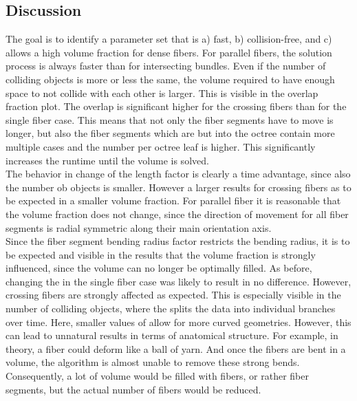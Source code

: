 \subsection{Discussion}
% 
The goal is to identify a parameter set that is a) fast, b) collision-free, and c) allows a high volume fraction for dense fibers.
For parallel fibers, the solution process is always faster than for intersecting bundles.
Even if the number of colliding objects is more or less the same, the volume required to have enough space to not collide with each other is larger.
This is visible in the overlap fraction plot.
The overlap is significant higher for the crossing fibers than for the single fiber case.
This means that not only the fiber segments have to move is longer, but also the fiber segments which are but into the octree contain more multiple cases and the number per octree leaf is higher.
This significantly increases the runtime until the volume is solved.
\\
% 
The behavior in change of the length factor \segLengthFactor{} is clearly a time advantage, since also the number ob objects is smaller.
However a larger \segLengthFactor{} results for crossing fibers as to be expected in a smaller volume fraction.
For parallel fiber it is reasonable that the volume fraction does not change, since the direction of movement for all fiber segments is radial symmetric along their main orientation axis.
\\
% 
Since the fiber segment bending radius factor \segRadiusFactor{} restricts the bending radius, it is to be expected and visible in the results that the volume fraction is strongly influenced, since the volume can no longer be optimally filled.
As before, changing the \segRadiusFactor{} in the single fiber case was likely to result in no difference.
However, crossing fibers are strongly affected as expected.
This is especially visible in the number of colliding objects, where the \segRadiusFactor{} splits the data into individual branches over time.
Here, smaller values of \segRadiusFactor{} allow for more curved geometries.
However, this can lead to unnatural results in terms of anatomical structure.
For example, in theory, a fiber could deform like a ball of yarn.
And once the fibers are bent in a volume, the algorithm is almost unable to remove these strong bends.
Consequently, a lot of volume would be filled with fibers, or rather fiber segments, but the actual number of fibers would be reduced.
\par
% 
